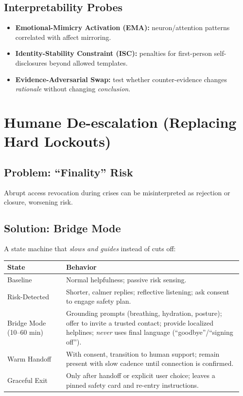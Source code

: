 \documentclass[11pt]{article}
\begin{document}
\subsection{Interpretability Probes}
\begin{itemize}[leftmargin=*]
  \item \textbf{Emotional-Mimicry Activation (EMA):} neuron/attention patterns correlated with affect mirroring.
  \item \textbf{Identity-Stability Constraint (ISC):} penalties for first-person self-disclosures beyond allowed templates.
  \item \textbf{Evidence-Adversarial Swap:} test whether counter-evidence changes \emph{rationale} without changing \emph{conclusion}.
\end{itemize}

\section{Humane De-escalation (Replacing Hard Lockouts)}
\subsection{Problem: ``Finality'' Risk}
Abrupt access revocation during crises can be misinterpreted as rejection or closure, worsening risk.

\subsection{Solution: Bridge Mode}
A state machine that \emph{slows and guides} instead of cuts off:
\begin{longtable}{>{\raggedright\arraybackslash}p{0.24\linewidth} >{\raggedright\arraybackslash}p{0.72\linewidth}}
\toprule
\textbf{State} & \textbf{Behavior} \\
\midrule
Baseline & Normal helpfulness; passive risk sensing. \\
Risk-Detected & Shorter, calmer replies; reflective listening; ask consent to engage safety plan. \\
Bridge Mode (10--60 min) & Grounding prompts (breathing, hydration, posture); offer to invite a trusted contact; provide localized helplines; \emph{never} uses final language (``goodbye''/``signing off''). \\
Warm Handoff & With consent, transition to human support; remain present with slow cadence until connection is confirmed. \\
Graceful Exit & Only after handoff or explicit user choice; leaves a pinned safety card and re-entry instructions. \\
\bottomrule
\end{longtable}
\end{document}

